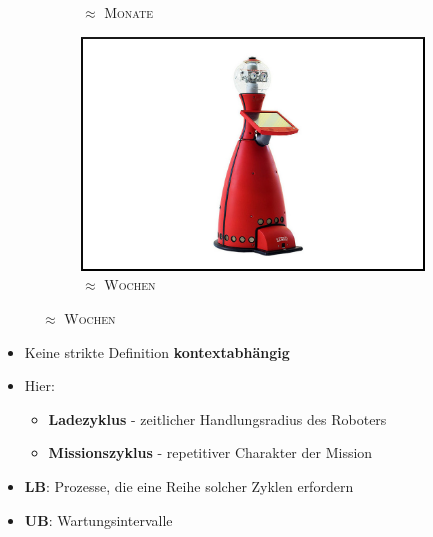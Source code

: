 \documentclass{beamer}
\begin{document}
\begin{frame}
\begin{figure}[H]
\begin{subfigure}[b]{0.32\textwidth}
      \caption*{\textsc{$\approx$ Monate \cite{WaveGlider}}}
    \end{subfigure}
    \begin{subfigure}[b]{0.32\textwidth}
      \centering
      \includegraphics[width=\textwidth]{img/service_robot.jpg}
      \caption*{\textsc{$\approx$ Wochen \cite{ServiceRobot}}}
    \end{subfigure}
  \end{figure}
  \begin{itemize}
    \item Keine strikte Definition \textrightarrow \thinspace \textbf{kontextabhängig}
    \item Hier:
    \begin{itemize}
      \item \textbf{Ladezyklus} - zeitlicher Handlungsradius des Roboters
      \item \textbf{Missionszyklus} - repetitiver Charakter der Mission
    \end{itemize}
    \item \textbf{LB}: Prozesse, die eine Reihe solcher Zyklen erfordern
    \item \textbf{UB}: Wartungsintervalle
  \end{itemize}
\end{frame}
\end{document}
